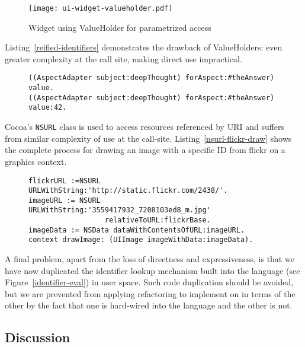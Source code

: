 \documentclass[preprint,authoryear]{llncs}
\begin{document}
\begin{figure}[htbp]
\begin{center}
\texttt{[image: ui-widget-valueholder.pdf]}
\caption{Widget using ValueHolder for parametrized access}
\label{ui-widget-valueholder}
\end{center}
\end{figure}

Listing~\ref{reified-identifiers} demonstrates the drawback of ValueHolders:  even greater complexity at the
call site, making direct use impractical. 


\begin{figure}[htbp]
\begin{lstlisting}[style=numbers,label=reified-identifiers,caption=Retrieve and store value via AspectAdaptor ValueHolder.]
((AspectAdapter subject:deepThought) forAspect:#theAnswer) value.
((AspectAdapter subject:deepThought) forAspect:#theAnswer) value:42.
\end{lstlisting}
\end{figure}

Cocoa's {\tt NSURL} class is used to access resources referenced by URI and suffers from similar complexity
of use at the call-site.  Listing~\ref{nsurl-flickr-draw}
shows the complete process for drawing an image with a specific ID from flickr on a graphics context.

\begin{figure}[htbp]
\begin{lstlisting}[style=numbers,label=nsurl-flickr-draw,caption=Retrieving and drawing an image stored on flickr.com.]
flickrURL :=NSURL URLWithString:'http://static.flickr.com/2438/'.
imageURL := NSURL URLWithString:'3559417932_7208103ed8_m.jpg'
                  relativeToURL:flickrBase.
imageData := NSData dataWithContentsOfURL:imageURL.
context drawImage: (UIImage imageWithData:imageData).
\end{lstlisting}
\end{figure}


A final problem, apart from the loss of directness and expressiveness, is that we have now 
duplicated the identifier lookup mechanism built into the language (see Figure~\ref{identifier-eval})
in user space.  Such code duplication should be avoided, but we are prevented from applying refactoring
to implement on in terms of the other by the fact that one is hard-wired into the language and the other is not.

\subsection{Discussion}
\end{document}
